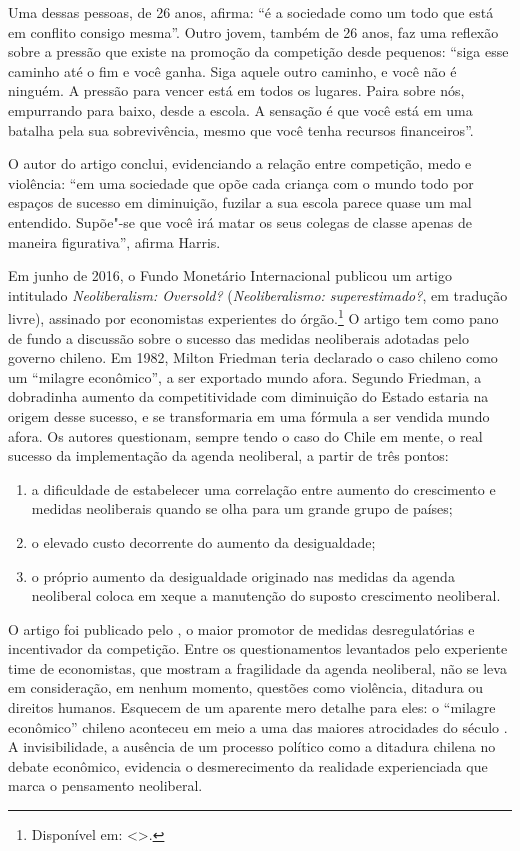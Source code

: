 Uma dessas pessoas, de 26 anos, afirma: ``é a sociedade como um
todo que está em conflito consigo mesma''. Outro jovem, também de 26
anos, faz uma reflexão sobre a pressão que existe na promoção da
competição desde pequenos: ``siga esse caminho até o fim e você ganha.
Siga aquele outro caminho, e você não é ninguém. A pressão para vencer
está em todos os lugares. Paira sobre nós, empurrando para baixo, desde
a escola. A sensação é que você está em uma batalha pela sua
sobrevivência, mesmo que você tenha recursos
financeiros''.

O autor do artigo conclui, evidenciando a relação entre
competição, medo e violência: ``em uma sociedade que opõe cada criança
com o mundo todo por espaços de sucesso em diminuição, fuzilar a sua
escola parece quase um mal entendido. Supõe"-se que você irá matar os
seus colegas de classe apenas de maneira figurativa'', afirma
Harris.

\asterisc

Em junho de 2016, o Fundo Monetário Internacional publicou um artigo
intitulado \emph{Neoliberalism: Oversold?} (\emph{Neoliberalismo:
superestimado?}, em tradução livre), assinado por economistas
experientes do órgão.\footnote{Disponível em: \textless{}{}\textgreater{}.}
O artigo tem como pano de fundo a discussão sobre o sucesso das medidas
neoliberais adotadas pelo governo chileno. Em 1982, Milton Friedman
teria declarado o caso chileno como um ``milagre econômico'', a ser
exportado mundo afora. Segundo Friedman, a dobradinha aumento da
competitividade com diminuição do Estado estaria na origem desse
sucesso, e se transformaria em uma fórmula a ser vendida mundo afora.
Os autores questionam, sempre tendo o caso do Chile em mente, o real
sucesso da implementação da agenda neoliberal, a partir de três pontos:

\begin{enumerate}[label=\roman*.]
\item 
  a dificuldade de estabelecer uma correlação entre aumento do
  crescimento e medidas neoliberais quando se olha para um grande grupo
  de países;
\item 
  o elevado custo decorrente do aumento da desigualdade;
\item 
  o próprio aumento da desigualdade originado nas medidas da agenda
  neoliberal coloca em xeque a manutenção do suposto crescimento
  neoliberal.
\end{enumerate}

O artigo foi publicado pelo , o maior promotor de medidas
desregulatórias e incentivador da competição. Entre os questionamentos
levantados pelo experiente time de economistas, que mostram a
fragilidade da agenda neoliberal, não se leva em consideração, em nenhum
momento, questões como violência, ditadura ou direitos humanos.
Esquecem de um aparente mero detalhe para eles: o ``milagre econômico''
chileno aconteceu em meio a uma das maiores atrocidades do século . A
invisibilidade, a ausência de um processo político como a ditadura
chilena no debate econômico, evidencia o desmerecimento da realidade
experienciada que marca o pensamento neoliberal.

